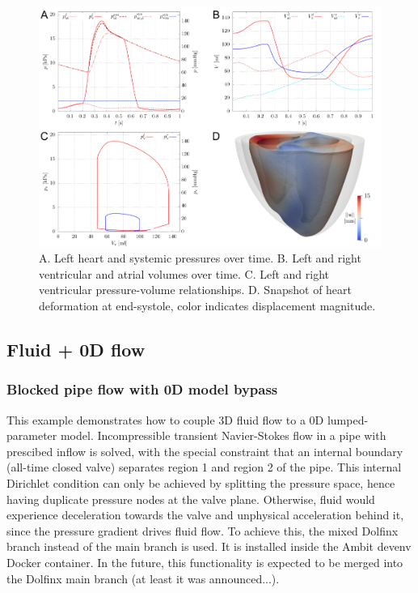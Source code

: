 \documentclass[a4paper,12pt]{report}
\begin{document}
\begin{figure}
\centering
\includegraphics[width=1.0\textwidth]{fig/heart_syspul_results.png}
\caption{A. Left heart and systemic pressures over time. B. Left and right ventricular and atrial volumes over time. C. Left and right ventricular pressure-volume relationships. D. Snapshot of heart deformation at end-systole, color indicates displacement magnitude.}
\label{fig:heart_syspul_results}
\end{figure}


\subsection{Fluid + 0D flow}\label{subsec:demos:fluid_flow0d}

\subsubsection*{Blocked pipe flow with 0D model bypass}

This example demonstrates how to couple 3D fluid flow to a 0D lumped-parameter model. Incompressible transient Navier-Stokes flow in a pipe with prescibed inflow is solved,
with the special constraint that an internal boundary (all-time closed valve) separates region 1 and region 2 of the pipe. This internal Dirichlet condition can only be achieved
by splitting the pressure space, hence having duplicate pressure nodes at the valve plane. Otherwise, fluid would experience deceleration towards the valve and unphysical acceleration behind it, since the pressure gradient drives fluid flow. To achieve this, the mixed Dolfinx branch instead of the main branch is used. It is installed inside the Ambit devenv Docker
container. In the future, this functionality is expected to be merged into the Dolfinx main branch (at least it was announced...).\\
\end{document}
